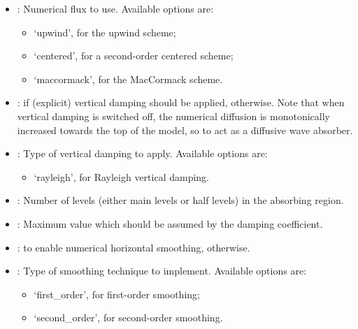 \documentclass[letterpaper,10pt,english]{sphinxmanual}
\begin{document}
\begin{description}
\begin{itemize}
\begin{itemize}
\end{itemize}

\item {} 
: Numerical flux to use. Available options are:
\begin{itemize}
\item {} 
‘upwind’, for the upwind scheme;

\item {} 
‘centered’, for a second-order centered scheme;

\item {} 
‘maccormack’, for the MacCormack scheme.

\end{itemize}

\item {} 
:  if (explicit) vertical damping should be applied,  otherwise.             Note that when vertical damping is switched off, the numerical diffusion is monotonically increased towards             the top of the model, so to act as a diffusive wave absorber.

\item {} 
: Type of vertical damping to apply. Available options are:
\begin{itemize}
\item {} 
‘rayleigh’, for Rayleigh vertical damping.

\end{itemize}

\item {} 
: Number of levels (either main levels or half levels) in the absorbing region.

\item {} 
: Maximum value which should be assumed by the damping coefficient.

\item {} 
:  to enable numerical horizontal smoothing,  otherwise.

\item {} 
: Type of smoothing technique to implement. Available options are:
\begin{itemize}
\item {} 
‘first\_order’, for first-order smoothing;

\item {} 
‘second\_order’, for second-order smoothing.


\end{itemize}
\end{itemize}
\end{description}
\end{document}
